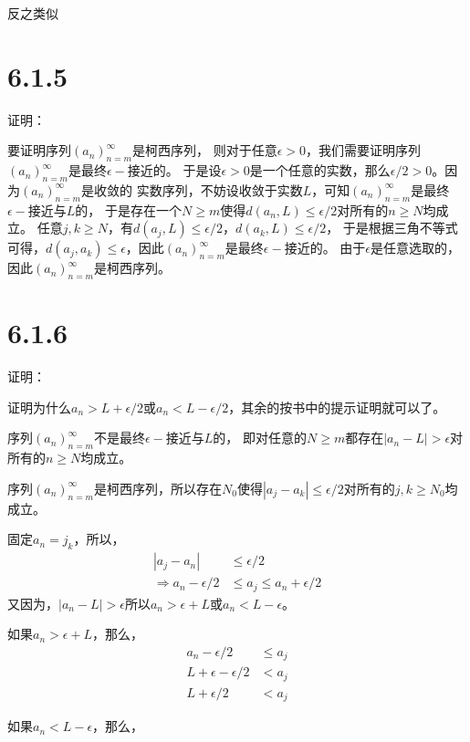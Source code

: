 \documentclass{article}
\theoremstyle{mystyle}
\begin{document}
反之类似

\section*{6.1.5}

证明：

要证明序列$(a_n)_{n=m}^\infty$是柯西序列，
则对于任意$\epsilon>0$，我们需要证明序列$(a_n)_{n=m}^\infty$是最终$\epsilon -$接近的。
于是设$\epsilon > 0$是一个任意的实数，那么$\epsilon/2 > 0$。因为$(a_n)_{n=m}^\infty$是收敛的
实数序列，不妨设收敛于实数$L$，可知$(a_n)_{n=m}^\infty$是最终$\epsilon -$接近与$L$的，
于是存在一个$N \geq m$使得$d(a_n,L)\leq \epsilon/2$对所有的$n \geq N$均成立。
任意$j,k \geq N$，有$d(a_j,L)\leq \epsilon/2$，$d(a_k,L)\leq \epsilon/2$，
于是根据三角不等式可得，$d(a_j,a_k) \leq \epsilon$，因此$(a_n)_{n=m}^\infty$是最终$\epsilon -$接近的。
由于$\epsilon$是任意选取的，因此$(a_n)_{n=m}^\infty$是柯西序列。

\section*{6.1.6}

证明：

证明为什么$a_n > L + \epsilon / 2$或$a_n < L - \epsilon / 2$，其余的按书中的提示证明就可以了。

序列$(a_n)_{n=m}^\infty$不是最终$\epsilon -$接近与$L$的，
即对任意的$N \geq m$都存在$|a_n - L| > \epsilon$对所有的$n \geq N$均成立。

序列$(a_n)_{n=m}^\infty$是柯西序列，所以存在$N_0$使得$|a_j - a_k| \leq \epsilon/2$对所有的$j,k \geq N_0$均成立。

固定$a_n=j_k$，所以，
\begin{align*}
  |a_j - a_n|                  & \leq \epsilon/2                      \\
  \Rightarrow a_n - \epsilon/2 & \leq a_j       \leq a_n + \epsilon/2
\end{align*}
又因为，$|a_n - L| > \epsilon$所以$a_n > \epsilon + L$或$a_n < L - \epsilon$。

如果$a_n > \epsilon + L$，那么，
\begin{align*}
  a_n - \epsilon/2          & \leq a_j \\
  L + \epsilon - \epsilon/2 & < a_j    \\
  L + \epsilon/2            & < a_j
\end{align*}

如果$a_n < L - \epsilon$，那么，
\end{document}
